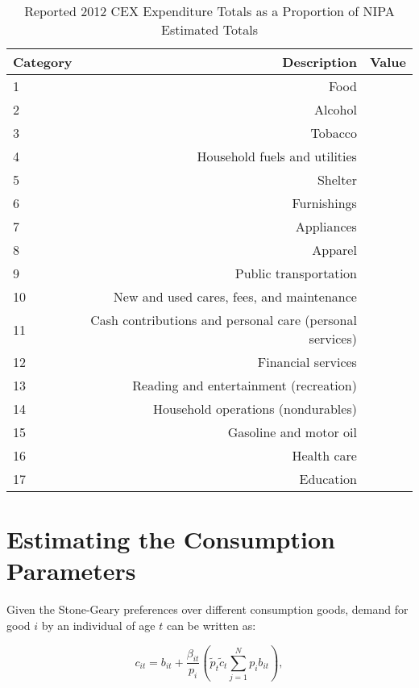 \documentclass[article,11pt,letterpaper,fleqn]{article}
\theoremstyle{definition}
\numberwithin{equation}{section}
\begin{document}
\begin{table}[h!]
  \centering
  \caption{Reported 2012 CEX Expenditure Totals as a Proportion of NIPA Estimated Totals}
    \begin{tabular}{lrr}
    \hline
    \hline
    Category & Description & Value \\
    \hline
    1     & Food  &  \\
    2     & Alcohol &  \\
    3     & Tobacco &  \\
    4     & Household fuels and utilities &  \\
    5     & Shelter &  \\
    6     & Furnishings &  \\
    7     & Appliances &  \\
    8     & Apparel &  \\
    9     & Public transportation &  \\
    10    & New and used cares, fees, and maintenance &  \\
    11    & Cash contributions and personal care (personal services) &  \\
    12    & Financial services &  \\
    13    & Reading and entertainment (recreation) &  \\
    14    & Household operations (nondurables) &  \\
    15    & Gasoline and motor oil &  \\
    16    & Health care &  \\
    17    & Education &  \\
    \hline
    \hline
    \end{tabular}%
  \label{tab:CEX_NIPA}%
\end{table}%


\section{Estimating the Consumption Parameters}

Given the Stone-Geary preferences over different consumption goods, demand for good $i$ by an individual of age $t$ can be written as:

\begin{equation}
\label{eqn:c_demand}
c_{it}=b_{it} + \frac{\beta_{it}}{p_{i}}\left(\tilde{p}_{t}\tilde{c}_{t}\sum_{j=1}^{N}p_{i}b_{it}\right),
\end{equation}
\end{document}
